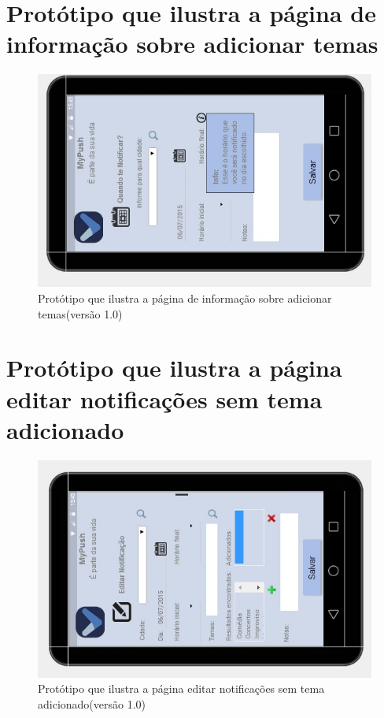 \begin{apendicesenv}
    \pagebreak
      \section*{Protótipo que ilustra a página de informação sobre adicionar temas}

    \begin{figure}[!htbp]
      \centering
      \includegraphics[scale=0.9, angle=-90]{editaveis/figuras/prototipo_alta_fidelidade_v1/1_13}
      \caption{Protótipo que ilustra a página de informação sobre adicionar temas(versão 1.0)}
      \label{v1}
    \end{figure}
    
    \pagebreak
      \section*{Protótipo que ilustra a página editar notificações sem tema adicionado}

    \begin{figure}[!htbp]
      \centering
      \includegraphics[scale=0.9, angle=-90]{editaveis/figuras/prototipo_alta_fidelidade_v1/1_14}
      \caption{Protótipo que ilustra a página editar notificações sem tema adicionado(versão 1.0)}
      \label{v1}
    \end{figure}
    

\end{apendicesenv}

